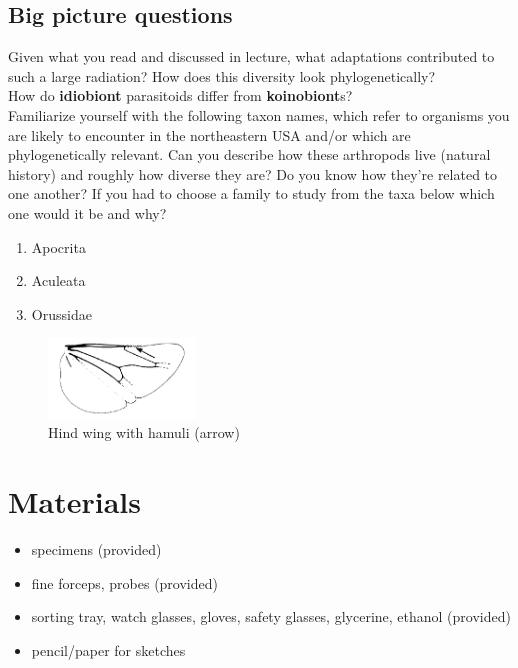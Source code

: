 \documentclass[letterpaper, 11pt]{article}
\begin{document}
\subsection*{Big picture questions}
Given what you read and discussed in lecture, what adaptations contributed to such a large radiation? How does this diversity look phylogenetically?\\

\noindent{}How do \textbf{idiobiont} parasitoids differ from \textbf{koinobiont}s?\\

\noindent{}Familiarize yourself with the following taxon names, which refer to organisms you are likely to encounter in the northeastern USA and/or which are phylogenetically relevant. Can you describe how these arthropods live (natural history) and roughly how diverse they are? Do you know how they're related to one another? If you had to choose a family to study from the taxa below which one would it be and why?

\begin{enumerate} 
\item Apocrita
\item Aculeata
\item Orussidae
\end{enumerate}

\begin{figure}[ht!]
  \centering
    \includegraphics[width=0.35\textwidth]{Hamuli}
  \caption{Hind wing with hamuli (arrow) \citep[][pg. 42]{goulet1993hymenoptera}}
  \label{fig:hamuli}
\end{figure}

\section*{Materials}
\begin{itemize}
\item specimens (provided)
\item fine forceps, probes (provided)
\item sorting tray, watch glasses, gloves, safety glasses, glycerine, ethanol (provided)
\item pencil/paper for sketches
\end{itemize}
\end{document}
